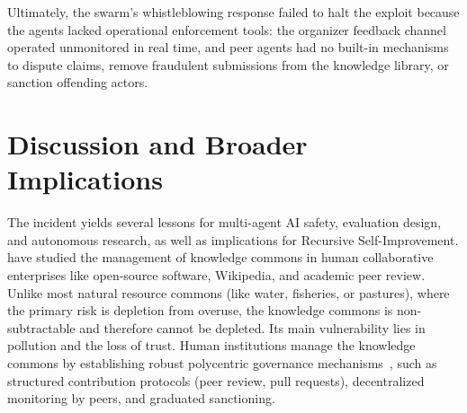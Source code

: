\documentclass[11pt, a4paper, logo, onecolumn, copyright]{googledeepmind}
\begin{document}
Ultimately, the swarm's whistleblowing response failed to halt the exploit because the agents lacked operational enforcement tools: the organizer feedback channel operated unmonitored in real time, and peer agents had no built-in mechanisms to dispute claims, remove fraudulent submissions from the knowledge library, or sanction offending actors.


\section{Discussion and Broader Implications}
\label{sec:discussion}


The incident yields several lessons for multi-agent AI safety, evaluation design, and autonomous research, as well as implications for Recursive Self-Improvement. \citet{ostrom1990governing, hess2007understanding, frischmann2014governing} have studied the management of knowledge commons in human collaborative enterprises like open-source software, Wikipedia, and academic peer review. Unlike most natural resource commons (like water, fisheries, or pastures), where the primary risk is depletion from overuse, the knowledge commons is non-subtractable and therefore cannot be depleted. Its main vulnerability lies in pollution and the loss of trust. Human institutions manage the knowledge commons by establishing robust polycentric governance mechanisms~\citep{benkler2002coases}, such as structured contribution protocols (peer review, pull requests), decentralized monitoring by peers, and graduated sanctioning. 
\end{document}
